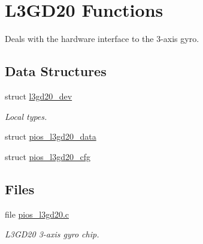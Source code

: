 \hypertarget{group___p_i_o_s___l3_g_d20}{\section{\-L3\-G\-D20 \-Functions}
\label{group___p_i_o_s___l3_g_d20}
}


\-Deals with the hardware interface to the 3-\/axis gyro.  


\subsection*{\-Data \-Structures}
\begin{DoxyCompactItemize}
\item 
struct \hyperlink{structl3gd20__dev}{l3gd20\-\_\-dev}
\begin{DoxyCompactList}\small\item\em \-Local types. \end{DoxyCompactList}\item 
struct \hyperlink{structpios__l3gd20__data}{pios\-\_\-l3gd20\-\_\-data}
\item 
struct \hyperlink{structpios__l3gd20__cfg}{pios\-\_\-l3gd20\-\_\-cfg}
\end{DoxyCompactItemize}
\subsection*{\-Files}
\begin{DoxyCompactItemize}
\item 
file \hyperlink{pios__l3gd20_8c}{pios\-\_\-l3gd20.\-c}
\begin{DoxyCompactList}\small\item\em \-L3\-G\-D20 3-\/axis gyro chip. \end{DoxyCompactList}\end{DoxyCompactItemize}
